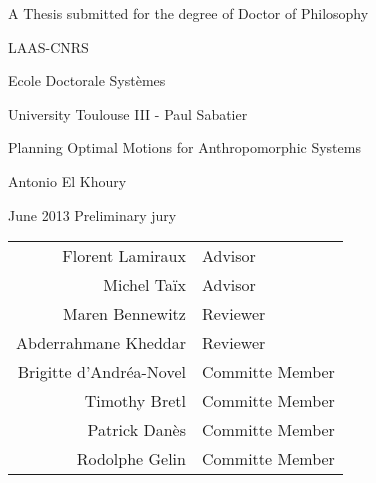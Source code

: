 \begin{titlepage}
\null\vfill
\begin{center}\Large
A Thesis submitted for the degree of
Doctor of Philosophy\par\vskip1cm
LAAS-CNRS\par
Ecole Doctorale Syst\`emes\par
University Toulouse III - Paul Sabatier\par
\vskip1cm
\Large Planning Optimal Motions for Anthropomorphic Systems \par
\vskip1cm
Antonio El Khoury \par
June 2013
\vskip1cm
Preliminary jury
\begin{table}
  \centering
  \begin{tabular}{rl}
    Florent Lamiraux & Advisor \\
    Michel Ta\"ix & Advisor \\
    Maren Bennewitz & Reviewer \\
    Abderrahmane Kheddar & Reviewer \\
    Brigitte d'Andr\'ea-Novel & Committe Member \\
    Timothy Bretl & Committe Member \\
    Patrick Dan\`es & Committe Member \\
    Rodolphe Gelin & Committe Member \\
  \end{tabular}
\end{table}
\end{center}\vfill
\end{titlepage}
